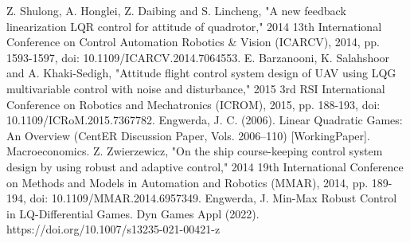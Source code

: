 \documentclass[conference]{IEEEtran}
\begin{document}
\begin{thebibliography}{00}
 Z. Shulong, A. Honglei, Z. Daibing and S. Lincheng, "A new feedback linearization LQR control for attitude of quadrotor," 2014 13th International Conference on Control Automation Robotics \& Vision (ICARCV), 2014, pp. 1593-1597, doi: 10.1109/ICARCV.2014.7064553.
 E. Barzanooni, K. Salahshoor and A. Khaki-Sedigh, "Attitude flight control system design of UAV using LQG multivariable control with noise and disturbance," 2015 3rd RSI International Conference on Robotics and Mechatronics (ICROM), 2015, pp. 188-193, doi: 10.1109/ICRoM.2015.7367782.
 Engwerda, J. C. (2006). Linear Quadratic Games: An Overview (CentER Discussion Paper, Vols. 2006–110) [WorkingPaper]. Macroeconomics.
 Z. Zwierzewicz, "On the ship course-keeping control system design by using robust and adaptive control," 2014 19th International Conference on Methods and Models in Automation and Robotics (MMAR), 2014, pp. 189-194, doi: 10.1109/MMAR.2014.6957349.
 Engwerda, J. Min-Max Robust Control in LQ-Differential Games. Dyn Games Appl (2022). https://doi.org/10.1007/s13235-021-00421-z



\end{thebibliography}
\end{document}
